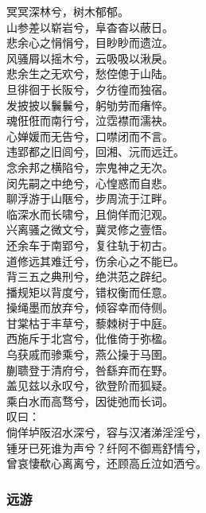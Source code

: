 \documentclass[]{article}
\begin{document}
冥冥深林兮，树木郁郁。\\
山参差以崭岩兮，阜杳杳以蔽日。\\
悲余心之悁悁兮，目眇眇而遗泣。\\
风骚屑以摇木兮，云吸吸以湫戾。\\
悲余生之无欢兮，愁倥傯于山陆。\\
旦徘徊于长阪兮，夕彷徨而独宿。\\
发披披以鬤鬤兮，躬劬劳而瘏悴。\\
魂俇俇而南行兮，泣霑襟而濡袂。\\
心婵媛而无告兮，口噤闭而不言。\\
违郢都之旧闾兮，回湘、沅而远迁。\\
念余邦之横陷兮，宗鬼神之无次。\\
闵先嗣之中绝兮，心惶惑而自悲。\\
聊浮游于山陿兮，步周流于江畔。\\
临深水而长啸兮，且倘佯而氾观。\\
兴离骚之微文兮，冀灵修之壹悟。\\
还余车于南郢兮，复往轨于初古。\\
道修远其难迁兮，伤余心之不能已。\\
背三五之典刑兮，绝洪范之辟纪。\\
播规矩以背度兮，错权衡而任意。\\
操绳墨而放弃兮，倾容幸而侍侧。\\
甘棠枯于丰草兮，藜棘树于中庭。\\
西施斥于北宫兮，仳倠倚于弥楹。\\
乌获戚而骖乘兮，燕公操于马圉。\\
蒯聩登于清府兮，咎繇弃而在野。\\
盖见兹以永叹兮，欲登阶而狐疑。\\
乘白水而高骛兮，因徙弛而长词。\\
叹曰：\\
倘佯垆阪沼水深兮，容与汉渚涕淫淫兮，\\
锺牙已死谁为声兮？纤阿不御焉舒情兮，\\
曾哀悽欷心离离兮，还顾高丘泣如洒兮。

\hypertarget{header-n361}{%
\subsubsection{远游}\label{header-n361}}
\end{document}
